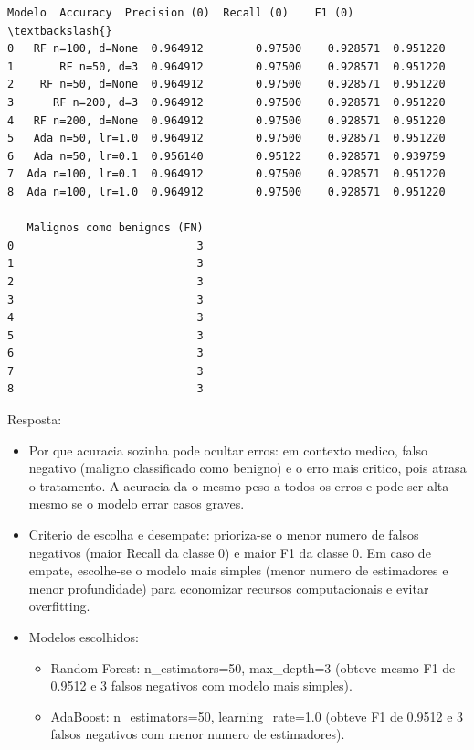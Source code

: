 \documentclass[11pt]{article}
\makeatletter
\providecommand{\tightlist}{%
      \setlength{\itemsep}{0pt}\setlength{\parskip}{0pt}}
\newcommand{\boxspacing}{\kern\kvtcb@left@rule\kern\kvtcb@boxsep}
\newcommand{\prompt}[4]{
        {\ttfamily\llap{{\color{#2}[#3]:\hspace{3pt}#4}}\vspace{-\baselineskip}}
    }
\makeatother
\begin{document}
            \begin{tcolorbox}[breakable, size=fbox, boxrule=.5pt, pad at break*=1mm, opacityfill=0]
\prompt{Out}{outcolor}{4}{\boxspacing}
\begin{Verbatim}[commandchars=\\\{\}]
              Modelo  Accuracy  Precision (0)  Recall (0)    F1 (0)  \textbackslash{}
0   RF n=100, d=None  0.964912        0.97500    0.928571  0.951220
1       RF n=50, d=3  0.964912        0.97500    0.928571  0.951220
2    RF n=50, d=None  0.964912        0.97500    0.928571  0.951220
3      RF n=200, d=3  0.964912        0.97500    0.928571  0.951220
4   RF n=200, d=None  0.964912        0.97500    0.928571  0.951220
5   Ada n=50, lr=1.0  0.964912        0.97500    0.928571  0.951220
6   Ada n=50, lr=0.1  0.956140        0.95122    0.928571  0.939759
7  Ada n=100, lr=0.1  0.964912        0.97500    0.928571  0.951220
8  Ada n=100, lr=1.0  0.964912        0.97500    0.928571  0.951220

   Malignos como benignos (FN)
0                            3
1                            3
2                            3
3                            3
4                            3
5                            3
6                            3
7                            3
8                            3
\end{Verbatim}
\end{tcolorbox}
        
    Resposta:

\begin{itemize}
\tightlist
\item
  Por que acuracia sozinha pode ocultar erros: em contexto medico, falso
  negativo (maligno classificado como benigno) e o erro mais critico,
  pois atrasa o tratamento. A acuracia da o mesmo peso a todos os erros
  e pode ser alta mesmo se o modelo errar casos graves.
\item
  Criterio de escolha e desempate: prioriza-se o menor numero de falsos
  negativos (maior Recall da classe 0) e maior F1 da classe 0. Em caso
  de empate, escolhe-se o modelo mais simples (menor numero de
  estimadores e menor profundidade) para economizar recursos
  computacionais e evitar overfitting.
\item
  Modelos escolhidos:

  \begin{itemize}
  \tightlist
  \item
    Random Forest: n\_estimators=50, max\_depth=3 (obteve mesmo F1 de
    0.9512 e 3 falsos negativos com modelo mais simples).
  \item
    AdaBoost: n\_estimators=50, learning\_rate=1.0 (obteve F1 de 0.9512
    e 3 falsos negativos com menor numero de estimadores).
  \end{itemize}
\end{itemize}
\end{document}

